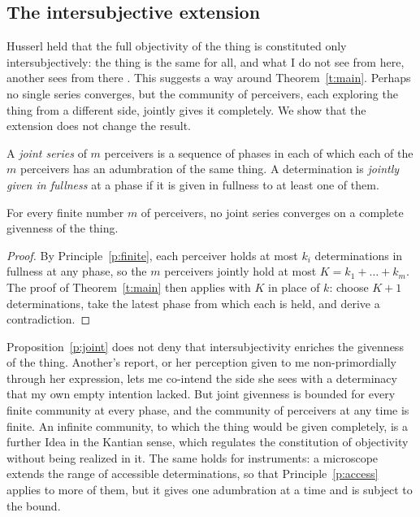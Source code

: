 \documentclass{situationist-preprint}
\begin{document}
\subsection{The intersubjective extension}

Husserl held that the full objectivity of the thing is constituted only intersubjectively: the thing is the same for all, and what I do not see from here, another sees from there \citep{Husserl1952}. This suggests a way around Theorem~\ref{t:main}. Perhaps no single series converges, but the community of perceivers, each exploring the thing from a different side, jointly gives it completely. We show that the extension does not change the result.

\begin{definition}\label{d:joint}
A \emph{joint series} of $m$ perceivers is a sequence of phases in each of which each of the $m$ perceivers has an adumbration of the same thing. A determination is \emph{jointly given in fullness} at a phase if it is given in fullness to at least one of them.
\end{definition}

\begin{proposition}\label{p:joint}
For every finite number $m$ of perceivers, no joint series converges on a complete givenness of the thing.
\end{proposition}

\begin{proof}
By Principle~\ref{p:finite}, each perceiver holds at most $k_i$ determinations in fullness at any phase, so the $m$ perceivers jointly hold at most $K = k_1 + \dots + k_m$. The proof of Theorem~\ref{t:main} then applies with $K$ in place of $k$: choose $K+1$ determinations, take the latest phase from which each is held, and derive a contradiction.
\end{proof}

Proposition~\ref{p:joint} does not deny that intersubjectivity enriches the givenness of the thing. Another's report, or her perception given to me non-primordially through her expression, lets me co-intend the side she sees with a determinacy that my own empty intention lacked. But joint givenness is bounded for every finite community at every phase, and the community of perceivers at any time is finite. An infinite community, to which the thing would be given completely, is a further Idea in the Kantian sense, which regulates the constitution of objectivity without being realized in it. The same holds for instruments: a microscope extends the range of accessible determinations, so that Principle~\ref{p:access} applies to more of them, but it gives one adumbration at a time and is subject to the bound.
\end{document}
